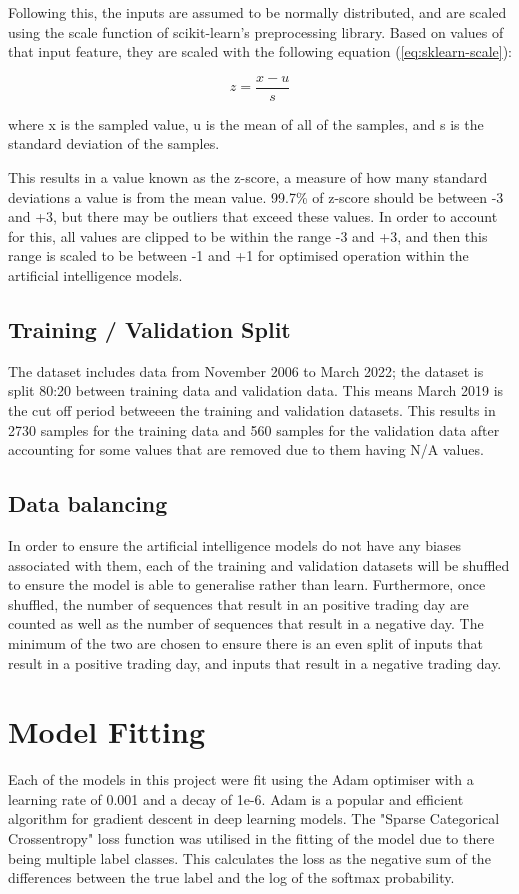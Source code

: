 Following this, the inputs are assumed to be normally distributed, and are scaled using the scale function of
scikit-learn's preprocessing library. Based on values of that input feature, they are scaled with the following
equation (\autoref{eq:sklearn-scale}):

\begin{equation}
    z = \frac{x - u}{s}
    \label{eq:sklearn-scale}
\end{equation}

where x is the sampled value, u is the mean of all of the samples, and s is the standard deviation of the samples.

This results in a value known as the z-score, a measure of how many standard deviations a value is from the mean value.
99.7\% of z-score should be between -3 and +3, but there may be outliers that exceed these values. In order to account for this,
all values are clipped to be within the range -3 and +3, and then this range is scaled to be between -1 and +1 for optimised
operation within the artificial intelligence models.

\subsection{Training / Validation Split}
The dataset includes data from November 2006 to March 2022; the dataset is split 80:20 between training data and
validation data. This means March 2019 is the cut off period betweeen the training and validation datasets. This
results in 2730 samples for the training data and 560 samples for the validation data after accounting for some
values that are removed due to them having N/A values.

\subsection{Data balancing}
In order to ensure the artificial intelligence models do not have any biases associated with them, each of the training
and validation datasets will be shuffled to ensure the model is able to generalise rather than learn. Furthermore, once
shuffled, the number of sequences that result in an positive trading day are counted as well as the number of sequences that result in
a negative day. The minimum of the two are chosen to ensure there is an even split of inputs that result in a positive trading day,
and inputs that result in a negative trading day.

\section{Model Fitting}
Each of the models in this project were fit using the Adam optimiser with a learning rate of 0.001 and a decay of
1e-6. Adam is a popular and efficient algorithm for gradient descent in deep learning models.
The "Sparse Categorical Crossentropy" loss function was utilised in the fitting of the model due to there being multiple
label classes. This calculates the loss as the negative sum of the differences between the true label and the log of the softmax
probability.

